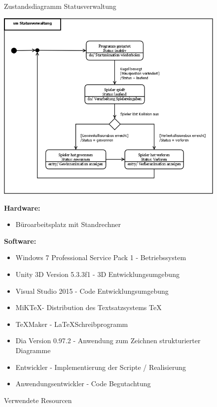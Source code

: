\begin{figure}[H]
\centering
\caption{Zustandsdiagramm Statusverwaltung}
\includegraphics[scale=0.35]{Bilder/Diagramme/smStatusverwaltung.png}

\raggedright
\caption{Verwendete Resourcen}
\textbf{Hardware:}
\begin{itemize}
\item Büroarbeitsplatz mit Standrechner
\end{itemize}
\textbf{Software:}
\begin{itemize}
\item Windows 7 Professional Service Pack 1 - Betriebssystem
\item Unity 3D Version 5.3.3f1 - 3D Entwicklungsumgebung
\item Visual Studio 2015 - Code Entwicklungsumgebung
\item MiK\TeX - Distribution des Textsatzsystems \TeX
\item \TeX{}Maker - \LaTeX Schreibprogramm
\item Dia Version 0.97.2 - Anwendung zum Zeichnen strukturierter Diagramme
\end{itemize}
\begin{itemize}
\item Entwickler - Implementierung der Scripte / Realisierung
\item Anwendungsentwickler - Code Begutachtung
\end{itemize}
\end{figure}


